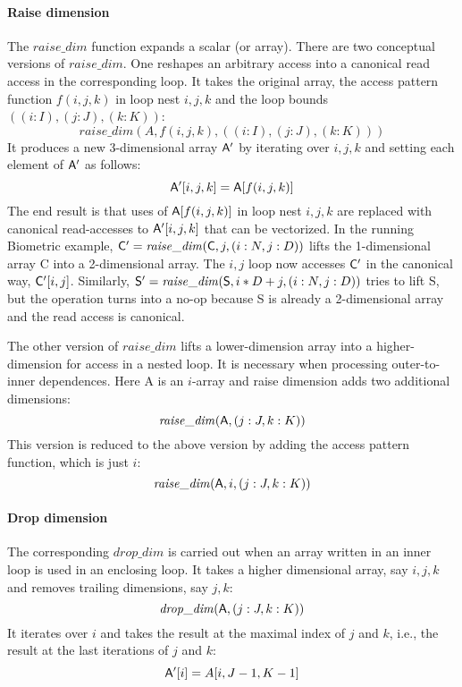 
\paragraph{Raise dimension} 
The $\mathit{raise\_dim}$ function expands a scalar (or array). 
There are two conceptual versions of $\mathit{raise\_dim}$. One reshapes an arbitrary access into a canonical read access in the corresponding loop. 
It takes the original array, the access pattern function $f(i,j,k)$ in loop nest $i,j,k$ and the loop bounds
$((i:I),(j:J),(k:K))$:
\[ \mathit{raise\_dim}(A, f(i,j,k), ((i:I),(j:J),(k:K))) \]
It produces a new 3-dimensional array ${\sf A'}$ by iterating over $i,j,k$ and setting each element of  ${\sf A'}$ as follows:
\[ {\sf A'}[i,j,k] =  {\sf A}[f(i,j,k)] \]
The end result is that uses of ${\sf A}[f(i,j,k)]$ in loop nest $i,j,k$ are replaced with canonical read-accesses to ${\sf A'}[i,j,k]$
that can be vectorized. In the running Biometric example, ${\sf C'} = \mathit{raise\_dim}({\sf C}, j, (i:N,j:D))$ lifts the
1-dimensional array {\sf C} into a 2-dimensional array. The $i,j$ loop now accesses ${\sf C'}$ in the canonical way, ${\sf C'}[i,j]$.
Similarly, ${\sf S'} = \mathit{raise\_dim}({\sf S}, i*D+j, (i:N,j:D))$ tries to lift {\sf S}, but the operation turns into a no-op
because {\sf S} is already a 2-dimensional array and the read access is canonical.

The other version of $\mathit{raise\_dim}$ lifts a lower-dimension array into a
higher-dimension for access in a nested loop. It is necessary when processing outer-to-inner dependences. 
Here {\sf A} is an $i$-array and raise dimension adds two additional dimensions:
\[ \mathit{raise\_dim}({\sf A}, (j:J,k:K)) \]
This version is reduced to the above version by adding the access pattern function, which is just $i$:
\[ \mathit{raise\_dim}({\sf A}, i, (j:J,k:K)) \]

\paragraph{Drop dimension}  
The corresponding $\mathit{drop\_dim}$ is carried out when an array written in an inner loop is used in an enclosing loop.
It takes a higher dimensional array, say $i,j,k$ and removes trailing dimensions, say $j,k$:
\[ \mathit{drop\_dim}({\sf A}, (j:J,k:K)) \]
It iterates over $i$ and takes the result at the maximal index of $j$ and $k$, i.e., the result at the last iterations of $j$ and $k$:
\[ {\sf A'}[i] = A[i,J-1,K-1] \]


